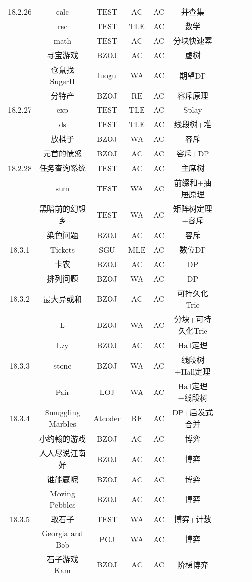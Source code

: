 \documentclass[landscape]{article}
\begin{document}
\begin{longtable}{cccccccccc}
  \hline
  18.2.26 & calc & TEST & AC & AC & 并查集\\
  & rec & TEST & TLE & AC & 数学\\
  & math & TEST & AC & AC & 分块快速幂\\
  & 寻宝游戏 & BZOJ & AC & AC & 虚树\\
  & 仓鼠找SugerII & luogu & WA & AC & 期望DP\\
  & 分特产 & BZOJ & RE & AC & 容斥原理\\
  \hline
  18.2.27 & exp & TEST & TLE & AC & Splay\\
  & ds & TEST & TLE & AC & 线段树+堆\\
  & 放棋子 & BZOJ & WA & AC & 容斥\\
  & 元首的愤怒 & BZOJ & AC & AC & 容斥+DP\\
  \hline
  18.2.28 & 任务查询系统 & TEST & AC & AC & 主席树\\
  & sum & TEST & WA & AC & 前缀和+抽屉原理\\
  & 黑暗前的幻想乡 & TEST & WA & AC & 矩阵树定理+容斥\\
  & 染色问题 & BZOJ & AC & AC & 容斥\\
  \hline
  18.3.1 & Tickets & SGU & MLE & AC & 数位DP\\
  & 卡农 & BZOJ & AC & AC & DP\\
  & 排列问题 & BZOJ & WA & AC & DP\\
  \hline
  18.3.2 & 最大异或和 & BZOJ & AC & AC & 可持久化Trie\\
  & L & BZOJ & WA & AC & 分块+可持久化Trie\\
  & Lzy & BZOJ & AC & AC & Hall定理\\
  \hline
  18.3.3 & stone & BZOJ & WA & AC & 线段树+Hall定理\\
  & Pair & LOJ & WA & AC & Hall定理+线段树\\
  \hline
  18.3.4 & Smuggling Marbles & Atcoder & RE & AC & DP+启发式合并\\
  & 小约翰的游戏 & BZOJ & AC & AC & 博弈\\
  & 人人尽说江南好 & BZOJ & AC & AC & 博弈\\
  & 谁能赢呢 & BZOJ & AC & AC & 博弈\\
  & Moving Pebbles & BZOJ & AC & AC & 博弈\\
  \hline
  18.3.5 & 取石子 & TEST & WA & AC & 博弈+计数\\
  & Georgia and Bob & POJ & WA & AC & 博弈\\
  & 石子游戏Kam & BZOJ & AC & AC & 阶梯博弈\\

\end{longtable}
\end{document}
